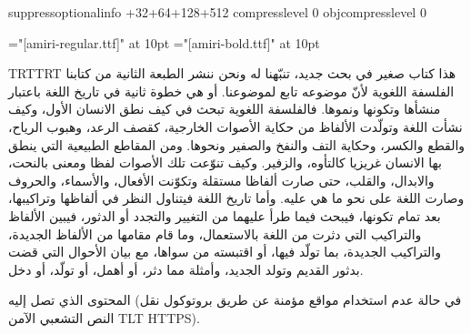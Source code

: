 \pdfvariable suppressoptionalinfo +32+64+128+512\relax
\pdfvariable compresslevel 0
\pdfvariable objcompresslevel 0




\font\amiriten="[amiri-regular.ttf]" at 10pt
\font\amiritenb="[amiri-bold.ttf]" at 10pt

\begingroup\pardir TRT\textdir TRT
\amiriten
هذا كتاب صغير في بحث جديد، تنبّهنا له ونحن ننشر الطبعة الثانية من كتابنا الفلسفة
اللغوية لأنّ موضوعه تابع لموضوعنا. أو هي خطوة ثانية في تاريخ اللغة باعتبار
منشأها وتكونها ونموها. فالفلسفة اللغوية تبحث في كيف نطق الانسان الأول، وكيف
نشأت اللغة وتولّدت الألفاظ من حكاية الأصوات الخارجية، ك{\amiritenb قصف الرعد}، وهبوب الرياح،
والقطع والكسر، وحكاية التف والنفخ والصفير ونحوها. ومن المقاطع الطبيعية التي
ينطق بها الانسان غريزيا كالتأوه، والزفير. وكيف تنوّعت تلك الأصوات لفظا ومعنى
بالنحت، والابدال، والقلب، حتى صارت ألفاظا مستقلة وتكوّنت الأفعال، والأسماء،
والحروف وصارت اللغة على نحو ما هي عليه.  وأما تاريخ اللغة فيتناول النظر في
ألفاظها وتراكيبها، بعد تمام تكونها، فيبحث فيما طرأ عليهما من التغيير والتجدد أو
الدثور، فيبين الألفاظ والتراكيب التي دثرت من اللغة بالاستعمال، وما قام مقامها
من الألفاظ الجديدة، والتراكيب الجديدة، بما تولّد فيها، أو اقتبسته من سواها، مع
بيان الأحوال التي قضت بدثور القديم وتولد الجديد، وأمثلة مما دثر، أو أهمل، أو
تولّد، أو دخل.

المحتوى الذي تصل إليه (في حالة عدم استخدام مواقع مؤمنة عن طريق بروتوكول نقل
النص التشعبي الآمن {\textdir TLT HTTPS}).
\par\endgroup\vfill\eject

\def\arabictext{%
هذا كتاب صغير في بحث جديد، تنبّهنا له ونحن ننشر الطبعة الثانية من كتابنا الفلسفة
اللغوية لأنّ موضوعه تابع لموضوعنا. أو هي خطوة ثانية في تاريخ اللغة باعتبار
منشأها وتكونها ونموها. فالفلسفة اللغوية تبحث في كيف نطق الانسان الأول، وكيف
نشأت اللغة وتولّدت الألفاظ من حكاية الأصوات الخارجية، كقصف الرعد، وهبوب الرياح،
والقطع والكسر، وحكاية التف والنفخ والصفير ونحوها. ومن المقاطع الطبيعية التي
ينطق بها الانسان غريزيا كالتأوه، والزفير. وكيف تنوّعت تلك الأصوات لفظا ومعنى
بالنحت، والابدال، والقلب، حتى صارت ألفاظا مستقلة وتكوّنت الأفعال، والأسماء،
والحروف وصارت اللغة على نحو ما هي عليه.  وأما تاريخ اللغة فيتناول النظر في
ألفاظها وتراكيبها، بعد تمام تكونها، فيبحث فيما طرأ عليهما من التغيير والتجدد أو
الدثور، فيبين الألفاظ والتراكيب التي دثرت من اللغة بالاستعمال، وما قام مقامها
من الألفاظ الجديدة، والتراكيب الجديدة، بما تولّد فيها، أو اقتبسته من سواها، مع
بيان الأحوال التي قضت بدثور القديم وتولد الجديد، وأمثلة مما دثر، أو أهمل، أو
تولّد، أو دخل.%
}

